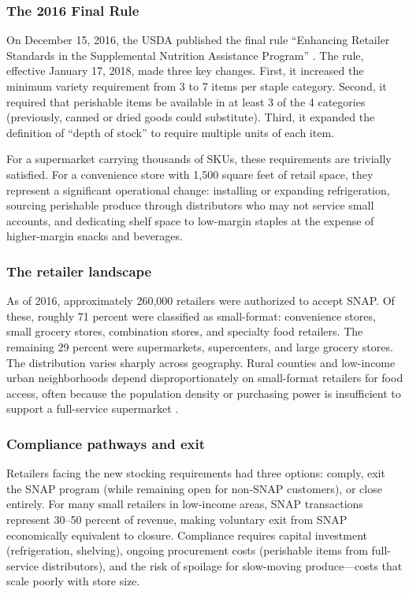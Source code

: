 \documentclass[12pt]{article}
\begin{document}
\subsubsection*{The 2016 Final Rule} On December 15, 2016, the USDA published the final rule ``Enhancing Retailer Standards in the Supplemental Nutrition Assistance Program'' \citep{usda2016snap}. The rule, effective January 17, 2018, made three key changes. First, it increased the minimum variety requirement from 3 to 7 items per staple category. Second, it required that perishable items be available in at least 3 of the 4 categories (previously, canned or dried goods could substitute). Third, it expanded the definition of ``depth of stock'' to require multiple units of each item.

For a supermarket carrying thousands of SKUs, these requirements are trivially satisfied. For a convenience store with 1,500 square feet of retail space, they represent a significant operational change: installing or expanding refrigeration, sourcing perishable produce through distributors who may not service small accounts, and dedicating shelf space to low-margin staples at the expense of higher-margin snacks and beverages.

\subsubsection*{The retailer landscape} As of 2016, approximately 260,000 retailers were authorized to accept SNAP. Of these, roughly 71 percent were classified as small-format: convenience stores, small grocery stores, combination stores, and specialty food retailers. The remaining 29 percent were supermarkets, supercenters, and large grocery stores. The distribution varies sharply across geography. Rural counties and low-income urban neighborhoods depend disproportionately on small-format retailers for food access, often because the population density or purchasing power is insufficient to support a full-service supermarket \citep{ver_ploeg2015access, shannon2020snapretail}.

\subsubsection*{Compliance pathways and exit} Retailers facing the new stocking requirements had three options: comply, exit the SNAP program (while remaining open for non-SNAP customers), or close entirely. For many small retailers in low-income areas, SNAP transactions represent 30--50 percent of revenue, making voluntary exit from SNAP economically equivalent to closure. Compliance requires capital investment (refrigeration, shelving), ongoing procurement costs (perishable items from full-service distributors), and the risk of spoilage for slow-moving produce---costs that scale poorly with store size.
\end{document}
